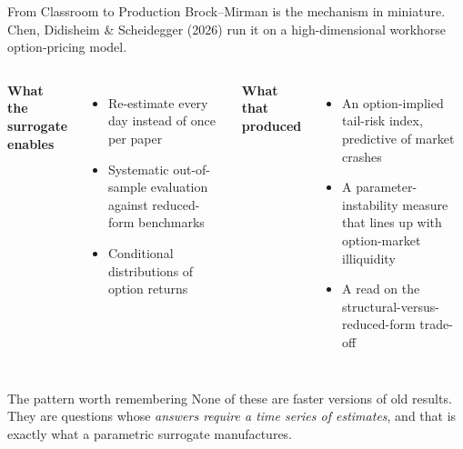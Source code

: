 \documentclass[aspectratio=169,11pt]{beamer}
\newcommand{\emphc}[1]{\textcolor{harvardcrimson}{#1}}
\begin{document}
\begin{frame}{From Classroom to Production}
\small
Brock--Mirman is the mechanism in miniature. Chen, Didisheim \& Scheidegger (2026) run it on a high-dimensional workhorse option-pricing model.

\vspace{0.2cm}
\begin{columns}[T]
\textbf{What the surrogate enables}
\begin{itemize}\itemsep1pt
  \item Re-estimate \emphc{every day} instead of once per paper
  \item Systematic out-of-sample evaluation against reduced-form benchmarks
  \item Conditional distributions of option returns
\end{itemize}

\textbf{What that produced}
\begin{itemize}\itemsep1pt
  \item An option-implied \emphc{tail-risk index}, predictive of market crashes
  \item A \emphc{parameter-instability} measure that lines up with option-market illiquidity
  \item A read on the structural-versus-reduced-form trade-off
\end{itemize}
\end{columns}

\vspace{0.25cm}
\begin{alertblock}{The pattern worth remembering}
None of these are faster versions of old results. They are questions whose \emph{answers require a time series of estimates}, and that is exactly what a parametric surrogate manufactures.
\end{alertblock}
\end{frame}


\end{document}
